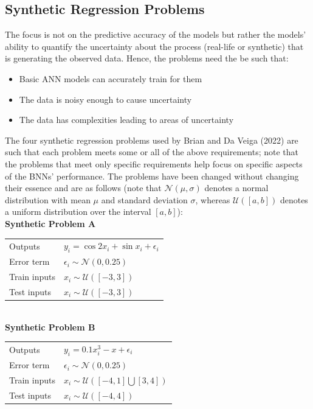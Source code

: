\documentclass[conference]{IEEEtran}
\begin{document}
\subsection{Synthetic Regression Problems}
The focus is not on the predictive accuracy of the models but rather the models' ability to quantify the uncertainty about the process (real-life or synthetic) that is generating the observed data. Hence, the problems need the be such that:\\

\begin{itemize}
    \item Basic ANN models can accurately train for them
    \item The data is noisy enough to cause uncertainty
    \item The data has complexities leading to areas of uncertainty\\
\end{itemize}

The four synthetic regression problems used by Brian and Da Veiga (2022) are such that each problem meets some or all of the above requirements; note that the problems that meet only specific requirements help focus on specific aspects of the BNNs' performance. The problems have been changed without changing their essence and are as follows (note that $\mathcal{N}(\mu, \sigma)$ denotes a normal distribution with mean $\mu$ and standard deviation $\sigma$, whereas $\mathcal{U}([a, b])$ denotes a uniform distribution over the interval $[a, b]$):\\

\textbf{Synthetic Problem A}

\begin{tabular}{m{2.5cm} | m{6cm}}
    Outputs & $y_i = \cos{2x_i} + \sin{x_i} + \epsilon_i$\\
    Error term & $\epsilon_i \sim \mathcal{N}(0, 0.25)$\\
    Train inputs & $x_i \sim \mathcal{U}([-3, 3])$\\
    Test inputs & $x_i \sim \mathcal{U}([-3, 3])$
\end{tabular}\\

\textbf{Synthetic Problem B}

\begin{tabular}{m{2.5cm} | m{6cm}}
    Outputs & $y_i = 0.1x_i^3 - x + \epsilon_i$\\
    Error term & $\epsilon_i \sim \mathcal{N}(0, 0.25)$\\
    Train inputs & $x_i \sim \mathcal{U}([-4, 1] \bigcup [3, 4])$\\
    Test inputs & $x_i \sim \mathcal{U}([-4, 4])$
\end{tabular}\\
\end{document}
